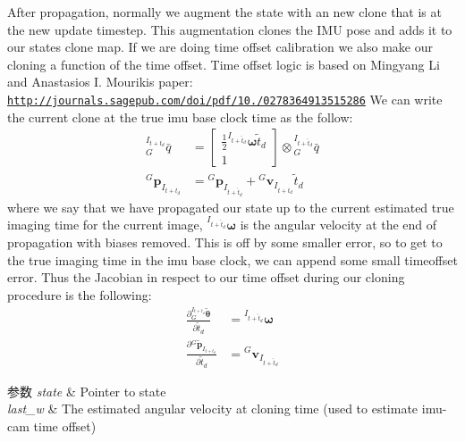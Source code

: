 After propagation, normally we augment the state with an new clone that is at the new update timestep. This augmentation clones the I\+MU pose and adds it to our state\textquotesingle{}s clone map. If we are doing time offset calibration we also make our cloning a function of the time offset. Time offset logic is based on Mingyang Li and Anastasios I. Mourikis paper\+: \href{http://journals.sagepub.com/doi/pdf/10.1177/0278364913515286}{\tt http\+://journals.\+sagepub.\+com/doi/pdf/10./0278364913515286} We can write the current clone at the true imu base clock time as the follow\+: \begin{align*} {}^{I_{t+t_d}}_G\bar{q} &= \begin{bmatrix}\frac{1}{2} {}^{I_{t+\hat{t}_d}}\boldsymbol\omega \tilde{t}_d \\ 1\end{bmatrix}\otimes{}^{I_{t+\hat{t}_d}}_G\bar{q} \\ {}^G\mathbf{p}_{I_{t+t_d}} &= {}^G\mathbf{p}_{I_{t+\hat{t}_d}} + {}^G\mathbf{v}_{I_{t+\hat{t}_d}}\tilde{t}_d \end{align*} where we say that we have propagated our state up to the current estimated true imaging time for the current image, ${}^{I_{t+\hat{t}_d}}\boldsymbol\omega$ is the angular velocity at the end of propagation with biases removed. This is off by some smaller error, so to get to the true imaging time in the imu base clock, we can append some small timeoffset error. Thus the Jacobian in respect to our time offset during our cloning procedure is the following\+: \begin{align*} \frac{\partial {}^{I_{t+t_d}}_G\tilde{\boldsymbol\theta}}{\partial \tilde{t}_d} &= {}^{I_{t+\hat{t}_d}}\boldsymbol\omega \\ \frac{\partial {}^G\tilde{\mathbf{p}}_{I_{t+t_d}}}{\partial \tilde{t}_d} &= {}^G\mathbf{v}_{I_{t+\hat{t}_d}} \end{align*}


\begin{DoxyParams}{参数}
{\em state} & Pointer to state \\
\hline
{\em last\+\_\+w} & The estimated angular velocity at cloning time (used to estimate imu-\/cam time offset) \\
\hline
\end{DoxyParams}
\mbox{\label{classov__msckf_1_1StateHelper_a3aecb942a1d9bb7dec915fdad303acc8}} 
